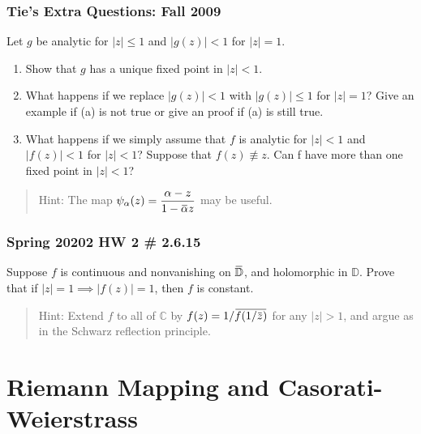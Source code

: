 \hypertarget{ties-extra-questions-fall-2009-10}{%
\subsubsection{Tie's Extra Questions: Fall
2009}\label{ties-extra-questions-fall-2009-10}}

Let \(g\) be analytic for \(|z|\leq 1\) and \(|g(z)| < 1\) for
\(|z| = 1\).

\begin{enumerate}
\def\labelenumi{\arabic{enumi}.}
\item
  Show that \(g\) has a unique fixed point in \(|z| < 1\).
\item
  What happens if we replace \(|g(z)| < 1\) with \(|g(z)|\leq 1\) for
  \(|z|=1\)? Give an example if (a) is not true or give an proof if (a)
  is still true.
\item
  What happens if we simply assume that \(f\) is analytic for
  \(|z| < 1\) and \(|f(z)| < 1\) for \(|z| < 1\)? Suppose that
  \(f(z) \not\equiv z\). Can f have more than one fixed point in
  \(|z| < 1\)?
\end{enumerate}

\begin{quote}
Hint: The map
\(\displaystyle{\psi_{\alpha}(z)=\frac{\alpha-z}{1-\mkern 1.5mu\overline{\mkern-1.5mu\alpha\mkern-1.5mu}\mkern 1.5muz}}\)
may be useful.
\end{quote}

\hypertarget{spring-20202-hw-2-2.6.15}{%
\subsubsection{Spring 20202 HW 2 \#
2.6.15}\label{spring-20202-hw-2-2.6.15}}

Suppose \(f\) is continuous and nonvanishing on
\(\mkern 1.5mu\overline{\mkern-1.5mu{\mathbb{D}}\mkern-1.5mu}\mkern 1.5mu\),
and holomorphic in \({\mathbb{D}}\). Prove that if
\({\left\lvert {z} \right\rvert} = 1 \implies {\left\lvert {f(z)} \right\rvert} = 1\),
then \(f\) is constant.

\begin{quote}
Hint: Extend \(f\) to all of \({\mathbb{C}}\) by
\(f(z) = 1/ \mkern 1.5mu\overline{\mkern-1.5muf(1/\mkern 1.5mu\overline{\mkern-1.5muz\mkern-1.5mu}\mkern 1.5mu)\mkern-1.5mu}\mkern 1.5mu\)
for any \({\left\lvert {z} \right\rvert} > 1\), and argue as in the
Schwarz reflection principle.
\end{quote}

\hypertarget{riemann-mapping-and-casorati-weierstrass}{%
\section{Riemann Mapping and
Casorati-Weierstrass}\label{riemann-mapping-and-casorati-weierstrass}}

